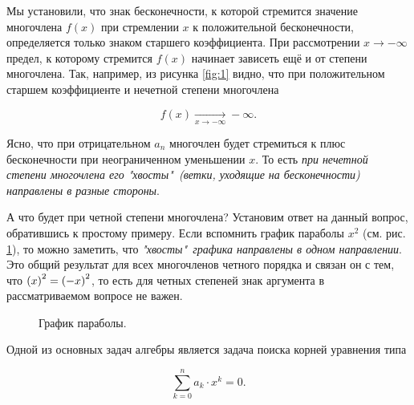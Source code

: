 \documentclass[12pt]{article}
\begin{document}
\par 
Мы установили, что знак бесконечности, к которой стремится значение многочлена $f(x)$ при стремлении $x$ к положительной бесконечности, определяется только знаком старшего коэффициента. При рассмотрении $x\rightarrow-\infty$ предел, к которому стремится $f(x)$ начинает зависеть ещё и от степени многочлена. Так, например, из рисунка \ref{fig:1} видно, что при положительном старшем коэффициенте и нечетной степени многочлена 

\begin{equation}
	f(x) \underset{x\rightarrow-\infty}{\longrightarrow}-\infty.
\end{equation}

\noindent Ясно, что при отрицательном $a_n$ многочлен будет стремиться к плюс бесконечности при неограниченном уменьшении $x$. То есть \emph{при нечетной степени многочлена его "хвосты"\ (ветки, уходящие на бесконечности) направлены в разные стороны}. 

\par А что будет при четной степени многочлена? Установим ответ на данный вопрос, обратившись к простому примеру. Если вспомнить график параболы $x^2$ (см. рис. \ref{fig:2}), то можно заметить, что \emph{"хвосты"\ графика направлены в одном направлении}. Это общий результат для всех многочленов четного порядка и связан он с тем, что $\qty(x)^2 = \qty(-x)^2$, то есть для четных степеней знак аргумента в рассматриваемом вопросе не важен. 

\begin{figure}[htbp]
\centering
{}
\caption{График параболы.}
\label{fig:2}
\end{figure}

\par
Одной из основных задач алгебры является задача поиска корней уравнения типа

\begin{equation}\label{eq:1}
\sum_{k=0}^n{a_k \cdot x^k} = 0.
\end{equation}
\end{document}
